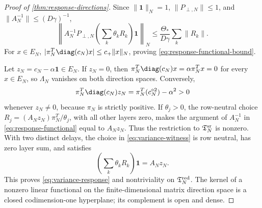 \begin{proof}[Proof of \cref{thm:response-directions}]
Since \(\|\mathbf1\|_N=1\), \(\|P_{\perp,N}\|\le1\), and
\(\|A_N^{-1}\|\le(D\gamma)^{-1}\),
\[
 \left\|A_N^{-1}P_{\perp,N}
       \left(\sum_k\theta_kR_k\right)\mathbf1\right\|_N
 \le\frac{\Theta_*}{D\gamma}\sum_k\|R_k\|.
\]
For \(x\in E_N\),
\(|\pi_N^T\diag(c_N)x|\le c_+\|x\|_N\), proving
\cref{eq:response-functional-bound}.

Let \(z_N=c_N-\alpha\mathbf1\in E_N\).  If \(z_N=0\), then
\(\pi_N^T\diag(c_N)x=\alpha\pi_N^Tx=0\) for every \(x\in E_N\), so
\(\Lambda_N\) vanishes on both direction spaces.  Conversely,
\begin{equation}
 \pi_N^T\diag(c_N)z_N
 =\pi_N^T(c_N^{\circ2})-\alpha^2>0                    \label{eq:positive-curvature-variance}
\end{equation}
whenever \(z_N\ne0\), because \(\pi_N\) is strictly positive.  If
\(\theta_j>0\), the row-neutral choice
\(R_j=(A_Nz_N)\pi_N^T/\theta_j\), with all other layers zero, makes the
argument of \(A_N^{-1}\) in \cref{eq:response-functional} equal to
\(A_Nz_N\).  Thus the restriction to \(\mathfrak T_N^{\rm sr}\) is
nonzero.  With two distinct delays, the choice in
\cref{eq:variance-witness} is row neutral, has zero layer sum, and satisfies
\[
 \left(\sum_k\theta_kR_k\right)\mathbf1=A_Nz_N.
\]
This proves \cref{eq:variance-response} and nontriviality on
\(\mathfrak T_N^{\rm red}\).  The kernel of a nonzero linear functional on
the finite-dimensional matrix direction space is a closed codimension-one
hyperplane; its complement is open and dense.
\end{proof}

